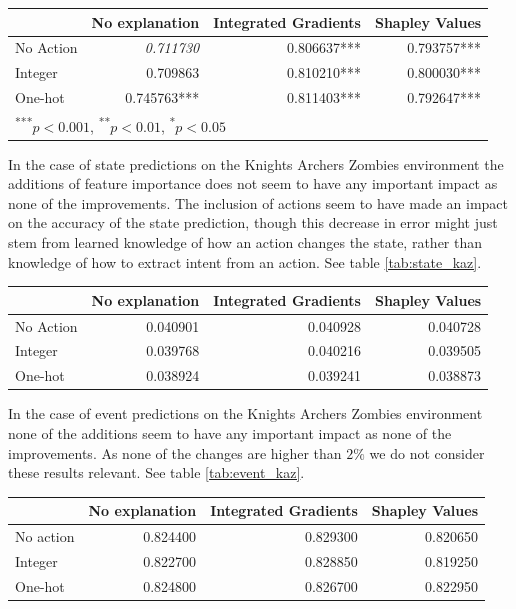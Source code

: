 \documentclass[UKenglish]{uiomasterthesis}
\begin{document}
\begin{center}
\label{tab:crit_simpl}
\begin{tabular}{lrrr}
\toprule
 & No explanation & Integrated Gradients & Shapley Values \\
\midrule
No Action & \textit{0.711730} & 0.806637*** & 0.793757*** \\
Integer & 0.709863 & 0.810210*** & 0.800030*** \\
One-hot & 0.745763*** & 0.811403*** & 0.792647*** \\
\bottomrule
\multicolumn{3}{l}{\textsuperscript{***}$p<0.001$, 
  \textsuperscript{**}$p<0.01$, 
  \textsuperscript{*}$p<0.05$}
\end{tabular}
\end{center}


In the case of state predictions on the Knights Archers Zombies environment the additions of feature importance does not seem to have any important impact as none of the improvements. The inclusion of actions seem to have made an impact on the accuracy of the state prediction, though this decrease in error might just stem from learned knowledge of how an action changes the state, rather than knowledge of how to extract intent from an action. See table \ref{tab:state_kaz}.

\begin{center}
\label{tab:state_kaz}
\begin{tabular}{lrrr}
\toprule
 & No explanation & Integrated Gradients & Shapley Values \\
\midrule
No Action & 0.040901 & 0.040928 & 0.040728 \\
Integer & 0.039768 & 0.040216 & 0.039505 \\
One-hot & 0.038924 & 0.039241 & 0.038873 \\
\bottomrule
\end{tabular}
\end{center}

In the case of event predictions on the Knights Archers Zombies environment none of the additions seem to have any important impact as none of the improvements. As none of the changes are higher than $2\%$ we do not consider these results relevant. See table \ref{tab:event_kaz}.

\begin{center}
\label{tab:event_kaz}
\begin{tabular}{lrrr}
\toprule
 & No explanation & Integrated Gradients & Shapley Values \\
\midrule
No action & 0.824400 & 0.829300 & 0.820650 \\
Integer & 0.822700 & 0.828850 & 0.819250 \\
One-hot & 0.824800 & 0.826700 & 0.822950 \\
\bottomrule
\end{tabular}
\end{center}
\end{document}
